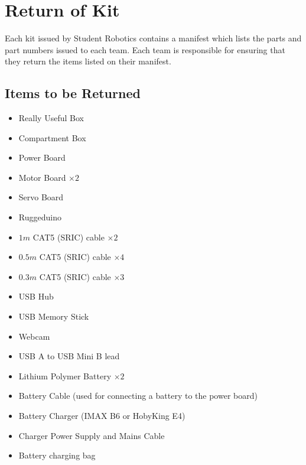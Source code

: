 \section {Return of Kit}
\label{sec:kit-return}

Each kit issued by Student Robotics contains a manifest which lists the parts and part numbers issued to each team.
Each team is responsible for ensuring that they return the items listed on their manifest.

\subsection {Items to be Returned}

\begin{itemize}
 \item Really Useful Box
 \item Compartment Box
\end{itemize}

\begin{itemize}
 \item Power Board
 \item Motor Board $\times 2$
 \item Servo Board
 \item Ruggeduino
 \item $  1m$ CAT5 (SRIC) cable $\times 2$
 \item $0.5m$ CAT5 (SRIC) cable $\times 4$
 \item $0.3m$ CAT5 (SRIC) cable $\times 3$
\end{itemize}

\begin{itemize}
 \item USB Hub
 \item USB Memory Stick
 \item Webcam
 \item USB A to USB Mini B lead
\end{itemize}

\begin{itemize}
 \item Lithium Polymer Battery $\times 2$
 \item Battery Cable (used for connecting a battery to the power board)
 \item Battery Charger (IMAX B6 or HobyKing E4)
 \item Charger Power Supply and Mains Cable
 \item Battery charging bag
\end{itemize}
